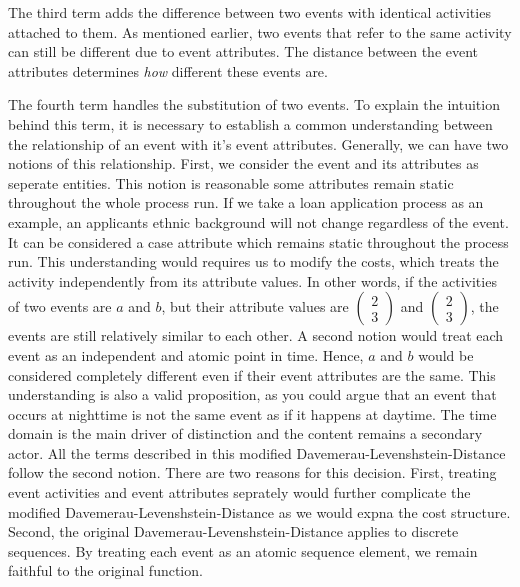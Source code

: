 \documentclass[./../../paper.tex]{subfiles}
\begin{document}
The third term adds the difference between two events with identical activities attached to them. As mentioned earlier, two events that refer to the same activity can still be different due to event attributes. The distance between the event attributes determines \emph{how} different these events are. 

The fourth term handles the substitution of two events. To explain the intuition behind this term, it is necessary to establish a common understanding between the relationship of an event with it's event attributes. Generally, we can have two notions of this relationship. First, we consider the event and its attributes as seperate entities. This notion is reasonable some attributes remain static throughout the whole process run. If we take a loan application process as an example, an applicants ethnic background will not change regardless of the event. It can be considered a case attribute which remains static throughout the process run. This understanding would requires us to modify the costs, which treats the activity independently from its attribute values. In other words, if the activities of two events are $a$ and $b$, but their attribute values are $\left(\begin{smallmatrix}2 \\ 3\end{smallmatrix}\right)$ and $\left(\begin{smallmatrix}2 \\ 3\end{smallmatrix}\right)$, the events are still relatively similar to each other. A second notion would treat each event as an independent and atomic point in time. Hence, $a$ and $b$ would be considered completely different even if their event attributes are the same. This understanding is also a valid proposition, as you could argue that an event that occurs at nighttime is not the same event as if it happens at daytime. The time domain is the main driver of distinction and the content remains a secondary actor. All the terms described in this modified Davemerau-Levenshstein-Distance follow the second notion. There are two reasons for this decision. First, treating event activities and event attributes seprately would further complicate the modified Davemerau-Levenshstein-Distance as we would expna the cost structure. Second, the original Davemerau-Levenshstein-Distance applies to discrete sequences. By treating each event as an atomic sequence element, we remain faithful to the original function.     
\end{document}
